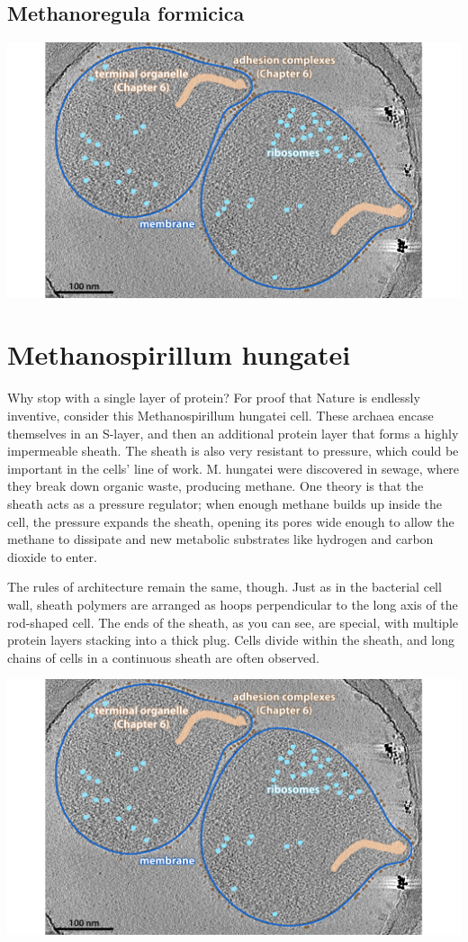 \documentclass[]{tufte-book}
\begin{document}
\hypertarget{Methanoregula_formicica}{\subsection{Methanoregula
formicica}\label{Methanoregula_formicica}}

\includegraphics{img/02_static/2_1_Mgenitalium}

\section{Methanospirillum hungatei}\label{methanospirillum-hungatei}

Why stop with a single layer of protein? For proof that Nature is
endlessly inventive, consider this Methanospirillum hungatei cell. These
archaea encase themselves in an S-layer, and then an additional protein
layer that forms a highly impermeable sheath. The sheath is also very
resistant to pressure, which could be important in the cells' line of
work. M. hungatei were discovered in sewage, where they break down
organic waste, producing methane. One theory is that the sheath acts as
a pressure regulator; when enough methane builds up inside the cell, the
pressure expands the sheath, opening its pores wide enough to allow the
methane to dissipate and new metabolic substrates like hydrogen and
carbon dioxide to enter.

The rules of architecture remain the same, though. Just as in the
bacterial cell wall, sheath polymers are arranged as hoops perpendicular
to the long axis of the rod-shaped cell. The ends of the sheath, as you
can see, are special, with multiple protein layers stacking into a thick
plug. Cells divide within the sheath, and long chains of cells in a
continuous sheath are often observed.

\includegraphics{img/02_static/2_1_Mgenitalium}
\end{document}
